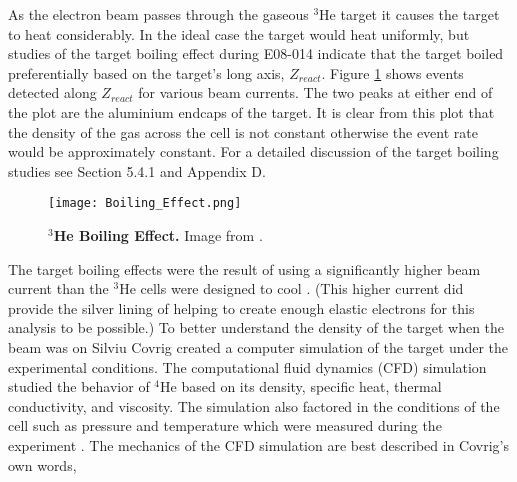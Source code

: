 As the electron beam passes through the gaseous $^3$He target it causes the target to heat considerably. In the ideal case the target would heat uniformly, but studies of the target boiling effect during E08-014 indicate that the target boiled preferentially based on the target's long axis, $Z_{react}$. Figure \ref{fig:boiling_effect} shows events detected along $Z_{react}$ for various beam currents. The two peaks at either end of the plot are the aluminium endcaps of the target. It is clear from this plot that the density of the gas across the cell is not constant otherwise the event rate would be approximately constant. For a detailed discussion of the target boiling studies see \cite{Thesis:Ye} Section 5.4.1 and Appendix D. 

\begin{figure}[!ht]
\begin{center}
\texttt{[image: Boiling\_Effect.png]}
\end{center}
\caption[$^3$He Boiling Effect]{
{\bf{$^3$He Boiling Effect.}} Image from \cite{Thesis:Ye}.}
\label{fig:boiling_effect}
\end{figure}

The target boiling effects were the result of using a significantly higher beam current than the $^3$He cells were designed to cool \cite{dave}. (This higher current did provide the silver lining of helping to create enough elastic electrons for this analysis to be possible.) To better understand the density of the target when the beam was on Silviu Covrig created a computer simulation of the target under the experimental conditions. The computational fluid dynamics (CFD) simulation studied the behavior of $^4$He based on its density, specific heat, thermal conductivity, and viscosity. The simulation also factored in the conditions of the cell such as pressure and temperature which were measured during the experiment \cite{density}. The mechanics of the CFD simulation are best described in Covrig's own words, 

